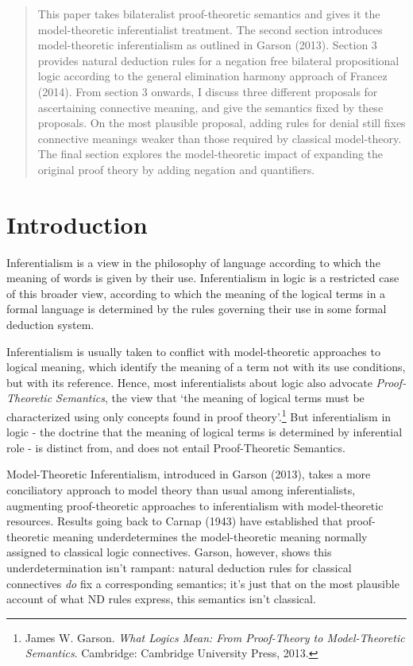 \documentclass[]{article}
\begin{document}
\begin{abstract}
This paper takes bilateralist proof-theoretic semantics and gives it the model-theoretic inferentialist treatment. The second section introduces model-theoretic inferentialism as outlined in Garson (2013). Section 3 provides natural deduction rules for a negation free bilateral propositional logic according to the general elimination harmony approach of Francez (2014). From section 3 onwards, I discuss three different proposals for ascertaining connective meaning, and give the semantics fixed by these proposals. On the most plausible proposal, adding rules for denial still fixes connective meanings weaker than those required by classical model-theory. The final section explores the model-theoretic impact of expanding the original proof theory by adding negation and quantifiers.
\end{abstract}
\section{Introduction}
Inferentialism is a view in the philosophy of language according to which the meaning of words is given by their use. Inferentialism in logic is a restricted case of this broader view, according to which the meaning of the logical terms in a formal language is determined by the rules governing their use in some formal deduction system.

Inferentialism is usually taken to conflict with model-theoretic approaches to logical meaning, which identify the meaning of a term not with its use conditions, but with its reference. Hence, most inferentialists about logic also advocate \textit{Proof-Theoretic Semantics}, the view that `the meaning of logical terms must be characterized using only concepts found in proof theory'.\footnote{James W. Garson. \textit{What Logics Mean: From Proof-Theory to Model-Theoretic Semantics}. Cambridge: Cambridge University Press, 2013.} But inferentialism in logic - the doctrine that the meaning of logical terms is determined by inferential role - is distinct from, and does not entail Proof-Theoretic Semantics.

Model-Theoretic Inferentialism, introduced in Garson (2013), takes a more conciliatory approach to model theory than usual among inferentialists, augmenting proof-theoretic approaches to inferentialism with model-theoretic resources. Results going back to Carnap (1943) have established that proof-theoretic meaning underdetermines the model-theoretic meaning normally assigned to classical logic connectives. Garson, however, shows this underdetermination isn't rampant: natural deduction rules for classical connectives \textit{do} fix a corresponding semantics; it's just that on the most plausible account of what ND rules express, this semantics isn't classical.
\end{document}
